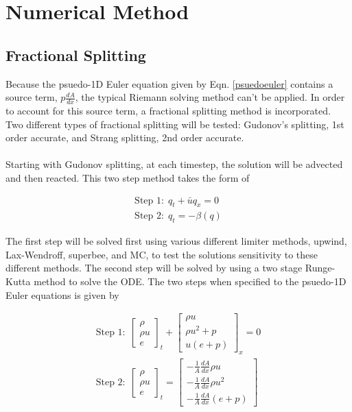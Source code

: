 \documentclass{article}%
\numberwithin{equation}{section}
\begin{document}
\section{Numerical Method}

\subsection{Fractional Splitting}
Because the psuedo-1D Euler equation given by Eqn. \ref{psuedoeuler} contains a source term, $p \frac{dA}{dx}$, the typical Riemann solving method can't be applied. In order to account for this source term, a fractional splitting method is incorporated. Two different types of fractional splitting will be tested: Gudonov's splitting, 1st order accurate, and Strang splitting, 2nd order accurate. 
\\
\\
Starting with Gudonov splitting, at each timestep, the solution will be advected and then reacted. This two step method takes the form of

\begin{equation}
\begin{split}
\text{Step 1:} \ \ q_t + \bar{u} q_x = 0 \\
\text{Step 2:} \ \ q_t = -\beta(q)
\end{split}
\end{equation}  

The first step will be solved first using various different limiter methods, upwind, Lax-Wendroff, superbee, and MC, to test the solutions sensitivity to these different methods. The second step will be solved by using a two stage Runge-Kutta method to solve the ODE. The two steps when specified to the psuedo-1D Euler equations is given by

\begin{equation}
\begin{split}
\text{Step 1:} \ \ \left[ \begin{array}{c} \rho  \\ \rho u  \\ e \end{array} \right]_t +  \left[ \begin{array}{c} \rho u  \\ \rho u^2 + p \\ u(e + p) \end{array} \right]_x =  0 \\
\text{Step 2:} \ \ \left[ \begin{array}{c} \rho  \\ \rho u  \\ e  \end{array} \right]_t = \left[ \begin{array}{c} -\frac{1}{A}\frac{dA}{dx} \rho u \\ -\frac{1}{A} \frac{dA}{dx} \rho u^2  \\ -\frac{1}{A} \frac{dA}{dx}  (e + p)  \end{array} \right]    \end{split}
\label{eq:splitting}
\end{equation}
\end{document}
